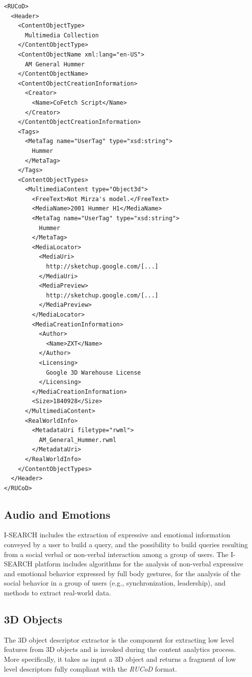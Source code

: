 \documentclass{www2012-comp-accepted}
\let\oldemph\emph
\renewcommand{\emph}[1]{\oldemph{\fontsize{9}{9}\selectfont #1}}
\begin{document}
\begin{lstlisting}[caption=Sample \mbox{\emph{RUCoD}} snippet (namespace declarations and some details removed for legibility reasons).,label={lst:rucod}]
<RUCoD>
  <Header>
    <ContentObjectType>
      Multimedia Collection
    </ContentObjectType>
    <ContentObjectName xml:lang="en-US">
      AM General Hummer
    </ContentObjectName>
    <ContentObjectCreationInformation>
      <Creator>
        <Name>CoFetch Script</Name>
      </Creator>
    </ContentObjectCreationInformation>
    <Tags>
      <MetaTag name="UserTag" type="xsd:string">
        Hummer
      </MetaTag>
    </Tags>
    <ContentObjectTypes>
      <MultimediaContent type="Object3d">
        <FreeText>Not Mirza's model.</FreeText>
        <MediaName>2001 Hummer H1</MediaName>
        <MetaTag name="UserTag" type="xsd:string">
          Hummer
        </MetaTag>
        <MediaLocator>
          <MediaUri>
            http://sketchup.google.com/[...]
          </MediaUri>
          <MediaPreview>
            http://sketchup.google.com/[...]
          </MediaPreview>
        </MediaLocator>
        <MediaCreationInformation>
          <Author>
            <Name>ZXT</Name>
          </Author>
          <Licensing>
            Google 3D Warehouse License
          </Licensing>
        </MediaCreationInformation>
        <Size>1840928</Size>
      </MultimediaContent>
      <RealWorldInfo>
        <MetadataUri filetype="rwml">
          AM_General_Hummer.rwml
        </MetadataUri>
      </RealWorldInfo>
    </ContentObjectTypes>
  </Header>
</RUCoD>
\end{lstlisting}

\subsection{Audio and Emotions}
\mbox{I-SEARCH} includes the extraction of expressive and emotional information conveyed by a user to build a query, and the possibility to build queries resulting from a social verbal or non-verbal interaction among a group of users.
The \mbox{I-SEARCH} platform includes algorithms for the analysis of non-verbal expressive and emotional behavior expressed by full body gestures, for the analysis of the social behavior in a group of users (e.g., synchronization, leadership), and methods to extract real-world data.

\subsection{3D Objects}
The 3D object descriptor extractor is the component for extracting low level features from 3D objects and is invoked during the content analytics process.
More specifically, it takes as input a 3D object and returns a fragment of low level descriptors fully compliant with the \mbox{\emph{RUCoD}} format.
\end{document}
